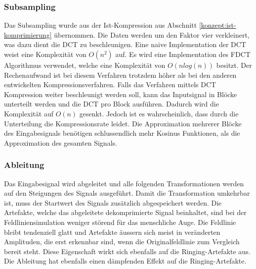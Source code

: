 \subsubsection{Subsampling} \label{konzept:loesung1:subsampling}
Das Subsampling wurde aus der Ist-Kompression aus Abschnitt \ref{konzept:ist-komprimierung} übernommen. Die Daten werden um den Faktor vier verkleinert, was dazu dient die DCT zu beschleunigen. Eine naive Implementation der DCT weist eine Komplexität von $O(n^2)$ auf. Es wird eine Implementation des FDCT Algorithmus verwendet, welche eine Komplexität von $O(n log(n))$ besitzt. Der Rechenaufwand ist bei diesem Verfahren trotzdem höher als bei den anderen entwickelten Kompressionsverfahren. Falls das Verfahren mittels DCT Kompression weiter beschleunigt werden soll, kann das Inputsignal in Blöcke unterteilt werden und die DCT pro Block ausführen. Dadurch wird die Komplexität auf $O(n)$ gesenkt. Jedoch ist es wahrscheinlich, dass durch die Unterteilung die Kompressionsrate leidet. Die Approximation mehrerer Blöcke des Eingabesignals benötigen schlussendlich mehr Kosinus Funktionen, als die Approximation des gesamten Signals.

\subsubsection{Ableitung}
Das Eingabesignal wird abgeleitet und alle folgenden Transformationen werden auf den Steigungen des Signals ausgeführt. Damit die Transformation umkehrbar ist, muss der Startwert des Signals zusätzlich abgespeichert werden. Die Artefakte, welche das abgeleitete dekomprimierte Signal beinhaltet, sind bei der Feldliniensimulation weniger störend für das menschliche Auge. Die Feldlinie bleibt tendenziell glatt und Artefakte äussern sich meist in veränderten Amplituden, die erst erkennbar sind, wenn die Originalfeldlinie zum Vergleich bereit steht. Diese Eigenschaft wirkt sich ebenfalls auf die Ringing-Artefakte aus. Die Ableitung hat ebenfalls einen dämpfenden Effekt auf die Ringing-Artefakte.

